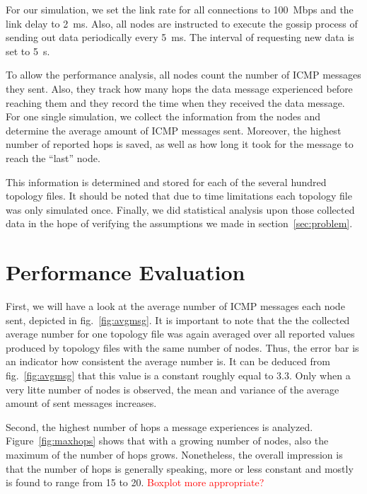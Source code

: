 \documentclass[12pt,journal]{IEEEtran}
\begin{document}
For our simulation, we set the link rate for all connections to 100~Mbps and the link delay to 2~ms. Also, all nodes are instructed to execute the gossip process of sending out data periodically every 5~ms. The interval of requesting new data is set to 5~s.

To allow the performance analysis, all nodes count the number of ICMP messages they sent. Also, they track how many hops the data message experienced before reaching them and they record the time when they received the data message. For one single simulation, we collect the information from the nodes and determine the average amount of ICMP messages sent. Moreover, the highest number of reported hops is saved, as well as how long it took for the message to reach the ``last'' node.

This information is determined and stored for each of the several hundred topology files. It should be noted that due to time limitations each topology file was only simulated once. Finally, we did statistical analysis upon those collected data in the hope of verifying the assumptions we made in section~\ref{sec:problem}.

\section{Performance Evaluation}

First, we will have a look at the average number of ICMP messages each node sent, depicted in fig.~\ref{fig:avgmsg}. It is important to note that the the collected average number for one topology file was again averaged over all reported values produced by topology files with the same number of nodes. Thus, the error bar is an indicator how consistent the average number is. It can be deduced from fig.~\ref{fig:avgmsg} that this value is a constant roughly equal to 3.3. Only when a very litte number of nodes is observed, the mean and variance of the average amount of sent messages increases.

Second, the highest number of hops a message experiences is analyzed. Figure~\ref{fig:maxhops} shows that with a growing number of nodes, also the maximum of the number of hops grows. Nonetheless, the overall impression is that the number of hops is generally speaking, more or less constant and mostly is found to range from 15 to 20. \textcolor{red}{Boxplot more appropriate?}
\end{document}
